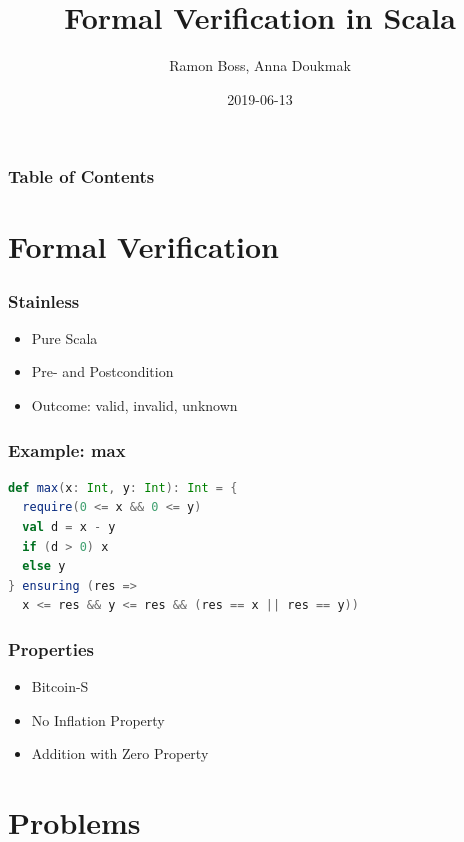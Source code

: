 \documentclass{beamer}
\begin{document}
\title{Formal Verification in Scala}
\author{Ramon Boss, Anna Doukmak}

\date{2019-06-13}

\frame{\titlepage}

\begin{frame}
  \frametitle{Table of Contents}
  \tableofcontents
\end{frame}

\section{Formal Verification}


\begin{frame}
\frametitle{Stainless}
\begin{itemize}
  \item Pure Scala
  \item Pre- and Postcondition
  \item Outcome: valid, invalid, unknown
\end{itemize}
\end{frame}


\begin{frame}[fragile]
\frametitle{Example: max}
\begin{lstlisting}[language=Scala]
def max(x: Int, y: Int): Int = {
  require(0 <= x && 0 <= y)
  val d = x - y
  if (d > 0) x
  else y
} ensuring (res =>
  x <= res && y <= res && (res == x || res == y))
\end{lstlisting}
\end{frame}


\begin{frame}
\frametitle{Properties}
\begin{itemize}
  \item Bitcoin-S
  \item No Inflation Property
  \item Addition with Zero Property
\end{itemize}
\end{frame}


\section{Problems}
\end{document}

